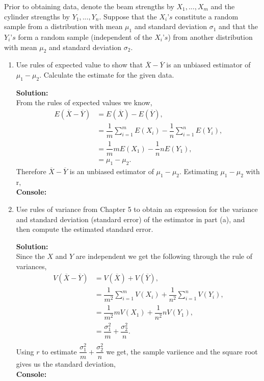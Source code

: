 \documentclass[12pt]{article}
\makeatletter
\theoremstyle{homework}
\newenvironment{exercise}[1]
{\def\@currentlabel{#1}\exercisecore}
{\endexercisecore}
\newcommand{\localhead}[1]{\par\smallskip\noindent\textbf{#1}\nobreak\\}%
\newcommand\solution{\localhead{Solution:}}
\makeatother
\begin{document}
\begin{exercise}{6.4} Prior  to  obtaining  data,  denote  the  beam  strengths  by  $X_1, ... ,X_m$   
  and  the  cylinder  strengths  by  $Y_1,  . . .  , Y_n.$ Suppose that the $X_i’s$ constitute a random sample from
  a  distribution  with  mean  $\mu_1$  and  standard  deviation  $\sigma_1$ and  that  the  $Y_i’s$  form  a random  sample  (independent  of the $X_i’s$)
  from another  distribution with mean $\mu_2$ and standard deviation $\sigma_2$.\\

  \begin{enumerate}
    \item Use  rules  of  expected  value  to  show  that $\overline{X} - \overline{Y}$ is an unbiased estimator of $\mu_1 - \mu_2$.
    Calculate the estimate for the given data.\\
    \solution From the rules of expected values we know,
    \begin{align*}
      E(\overline{X} - \overline{Y}) &= E(\overline{X}) - E(\overline{Y}),\\
       &= \dfrac{1}{m} \sum _{i = 1}^m E(X_i) - \dfrac{1}{n} \sum _{i = 1}^n E(Y_i),\\ 
       &= \dfrac{1}{m}mE(X_1) - \dfrac{1}{n}nE(Y_1),\\ 
       &= \mu_1 - \mu_2. 
    \end{align*}
    Therefore $\overline{X} - \overline{Y}$ is an unbiased estimator of $\mu_1 - \mu_2$. Estimating $\mu_1 - \mu_2$ with r,\\
    \textbf{Console:}
    \begin{center}
      
    \end{center}
  \vspace{.25in}

  \item  Use  rules  of  variance  from  Chapter  5  to  obtain  an  expression  for  the  variance  and 
   standard  deviation  (standard error) of the estimator in part (a), and then compute the estimated standard error.\\
   \solution Since the $X$ and $Y$ are independent we get the following through the rule of variances,
   \begin{align*}
     V(\overline{X} - \overline{Y}) &= V(\overline{X}) +  V(\overline{Y}),\\
     &=\dfrac{1}{m^2} \sum _{i = 1}^m V(X_i) + \dfrac{1}{n^2} \sum _{i = 1}^n V(Y_i),\\
     &=\dfrac{1}{m^2}mV(X_1) + \dfrac{1}{n^2}nV(Y_1),\\
     &=\dfrac{\sigma_1^2}{m} + \dfrac{\sigma_2^2}{n}.\\
   \end{align*}
   Using $r$ to estimate $\dfrac{\sigma_1^2}{m} + \dfrac{\sigma_2^2}{n}$ we get, the sample variience and the square
   root gives us the standard deviation,\\
   \textbf{Console:}
   \begin{center}
     
   \end{center}
   \vspace{.25in}



\end{enumerate}
\end{exercise}
\end{document}
